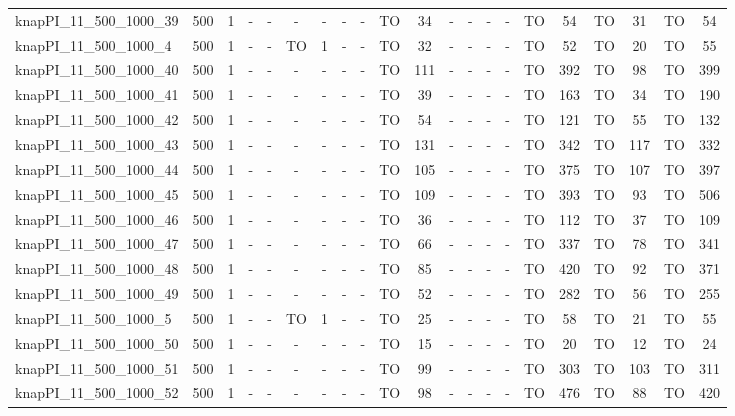 \begin{sidewaystable}[!ht]
{\begin{tabular}{lcccccccccccccccccccc}
knapPI\_11\_500\_1000\_39 & 500 & 1 &  - &  - &  - &  - &  - &  - & TO & 34 &  - &  - &  - &  - & TO & 54 & TO & 31 & TO & 54 \\
knapPI\_11\_500\_1000\_4 & 500 & 1 &  - &  - & TO & 1 &  - &  - & TO & 32 &  - &  - &  - &  - & TO & 52 & TO & 20 & TO & 55 \\
knapPI\_11\_500\_1000\_40 & 500 & 1 &  - &  - &  - &  - &  - &  - & TO & 111 &  - &  - &  - &  - & TO & 392 & TO & 98 & TO & 399 \\
knapPI\_11\_500\_1000\_41 & 500 & 1 &  - &  - &  - &  - &  - &  - & TO & 39 &  - &  - &  - &  - & TO & 163 & TO & 34 & TO & 190 \\
knapPI\_11\_500\_1000\_42 & 500 & 1 &  - &  - &  - &  - &  - &  - & TO & 54 &  - &  - &  - &  - & TO & 121 & TO & 55 & TO & 132 \\
knapPI\_11\_500\_1000\_43 & 500 & 1 &  - &  - &  - &  - &  - &  - & TO & 131 &  - &  - &  - &  - & TO & 342 & TO & 117 & TO & 332 \\
knapPI\_11\_500\_1000\_44 & 500 & 1 &  - &  - &  - &  - &  - &  - & TO & 105 &  - &  - &  - &  - & TO & 375 & TO & 107 & TO & 397 \\
knapPI\_11\_500\_1000\_45 & 500 & 1 &  - &  - &  - &  - &  - &  - & TO & 109 &  - &  - &  - &  - & TO & 393 & TO & 93 & TO & 506 \\
knapPI\_11\_500\_1000\_46 & 500 & 1 &  - &  - &  - &  - &  - &  - & TO & 36 &  - &  - &  - &  - & TO & 112 & TO & 37 & TO & 109 \\
knapPI\_11\_500\_1000\_47 & 500 & 1 &  - &  - &  - &  - &  - &  - & TO & 66 &  - &  - &  - &  - & TO & 337 & TO & 78 & TO & 341 \\
knapPI\_11\_500\_1000\_48 & 500 & 1 &  - &  - &  - &  - &  - &  - & TO & 85 &  - &  - &  - &  - & TO & 420 & TO & 92 & TO & 371 \\
knapPI\_11\_500\_1000\_49 & 500 & 1 &  - &  - &  - &  - &  - &  - & TO & 52 &  - &  - &  - &  - & TO & 282 & TO & 56 & TO & 255 \\
knapPI\_11\_500\_1000\_5 & 500 & 1 &  - &  - & TO & 1 &  - &  - & TO & 25 &  - &  - &  - &  - & TO & 58 & TO & 21 & TO & 55 \\
knapPI\_11\_500\_1000\_50 & 500 & 1 &  - &  - &  - &  - &  - &  - & TO & 15 &  - &  - &  - &  - & TO & 20 & TO & 12 & TO & 24 \\
knapPI\_11\_500\_1000\_51 & 500 & 1 &  - &  - &  - &  - &  - &  - & TO & 99 &  - &  - &  - &  - & TO & 303 & TO & 103 & TO & 311 \\
knapPI\_11\_500\_1000\_52 & 500 & 1 &  - &  - &  - &  - &  - &  - & TO & 98 &  - &  - &  - &  - & TO & 476 & TO & 88 & TO & 420 \\

\end{tabular}}
\end{sidewaystable}
